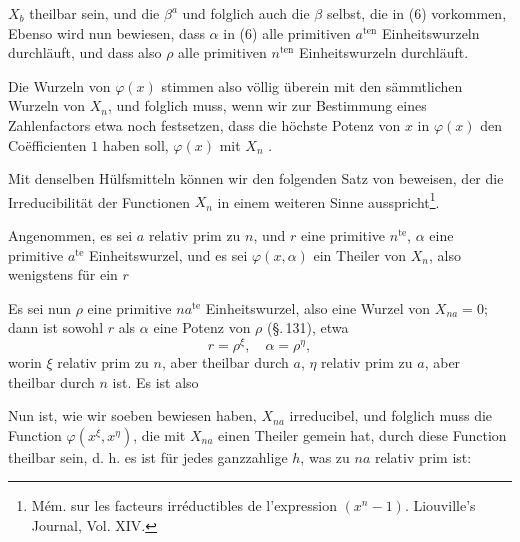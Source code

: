 $X_b$ theilbar sein, und die $\beta^a$ und folglich auch die $\beta$ selbst,
die in (6) vorkommen,  Ebenso wird nun bewiesen, dass $\alpha$ in (6) alle
primitiven $a^{\mathrm{ten}}$ Einheitswurzeln durchläuft, und dass also
$\rho$ alle primitiven $n^{\mathrm{ten}}$ Einheitswurzeln durchläuft.

Die Wurzeln von $\varphi(x)$ stimmen also völlig überein mit den sämmtlichen
Wurzeln von $X_n$, und folglich muss, wenn wir zur Bestimmung eines
Zahlenfactors etwa noch festsetzen, dass die höchste Potenz von $x$ in
$\varphi(x)$ den Co\"efficienten $1$ haben soll, $\varphi(x)$ mit $X_n$
.


Mit denselben Hülfsmitteln können wir den folgenden Satz von
 beweisen, der die Irreducibilität der Functionen $X_n$
in einem weiteren Sinne ausspricht\footnote{Mém. sur les facteurs
irréductibles de l'expression $(x^n - 1)$. Liouville's Journal, Vol. XIV.}.


Angenommen, es sei $a$ relativ prim zu $n$, und $r$ eine primitive
$n^{\mathrm{te}}$, $\alpha$ eine primitive $a^{\mathrm{te}}$ Einheitswurzel,
und es sei $\varphi(x,\alpha)$ ein Theiler von $X_n$, also wenigstens für
ein $r$


Es sei nun $\rho$ eine primitive $na^{\mathrm{te}}$ Einheitswurzel, also
eine Wurzel von $X_{na} = 0$; dann ist sowohl $r$ als $\alpha$ eine Potenz
von $\rho$ (\S.\,131), etwa
\[
r = \rho^{\xi},\quad \alpha = \rho^{\eta},
\]
worin $\xi$ relativ prim zu $n$, aber theilbar durch $a$, $\eta$ relativ
prim zu $a$, aber theilbar durch $n$ ist. Es ist also


Nun ist, wie wir soeben bewiesen haben, $X_{na}$ irreducibel, und folglich
muss die Function $\varphi(x^{\xi}, x^{\eta})$, die mit $X_{na}$ einen
Theiler gemein hat, durch diese Function theilbar sein, d. h. es ist für
jedes ganzzahlige $h$, was zu $na$ relativ prim ist:

